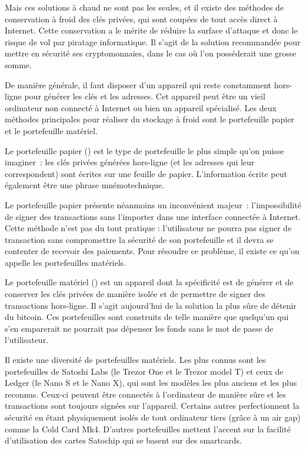 
Mais ces solutions à chaud ne sont pas les seules, et il existe des méthodes de conservation à froid des clés privées, qui sont coupées de tout accès direct à Internet. Cette conservation a le mérite de réduire la surface d'attaque et donc le risque de vol par piratage informatique. Il s'agit de la solution recommandée pour mettre en sécurité ses cryptomonnaies, dans le cas où l'on posséderait une grosse somme.

De manière générale, il faut disposer d'un appareil qui reste constamment hors-ligne pour générer les clés et les adresses. Cet appareil peut être un vieil ordinateur non connecté à Internet ou bien un appareil spécialisé. Les deux méthodes principales pour réaliser du stockage à froid sont le portefeuille papier et le portefeuille matériel.

Le portefeuille papier () est le type de portefeuille le plus simple qu'on puisse imaginer~: les clés privées générées hors-ligne (et les adresses qui leur correspondent) sont écrites sur une feuille de papier. L'information écrite peut également être une phrase mnémotechnique.

Le portefeuille papier présente néanmoins un inconvénient majeur~: l'impossibilité de signer des transactions sans l'importer dans une interface connectée à Internet. Cette méthode n'est pas du tout pratique : l'utilisateur ne pourra pas signer de transaction sans compromettre la sécurité de son portefeuille et il devra se contenter de recevoir des paiements. Pour résoudre ce problème, il existe ce qu'on appelle les portefeuilles matériels.

Le portefeuille matériel () est un appareil dont la spécificité est de générer et de conserver les clés privées de manière isolée et de permettre de signer des transactions hors-ligne. Il s'agit aujourd'hui de la solution la plus sûre de détenir du bitcoin. Ces portefeuilles sont construits de telle manière que quelqu'un qui s'en emparerait ne pourrait pas dépenser les fonds sans le mot de passe de l'utilisateur.

Il existe une diversité de portefeuilles matériels. Les plus connus sont les portefeuilles de Satoshi Labs (le Trezor One et le Trezor model T) et ceux de Ledger (le Nano S et le Nano X), qui sont les modèles les plus anciens et les plus reconnus. Ceux-ci peuvent être connectés à l'ordinateur de manière sûre et les transactions sont toujours signées sur l'appareil. Certains autres perfectionnent la sécurité en étant physiquement isolés de tout ordinateur tiers (grâce à un air gap) comme la Cold Card Mk4. D'autres portefeuilles mettent l'accent sur la facilité d'utilisation des cartes Satochip qui se basent sur des smartcards.

